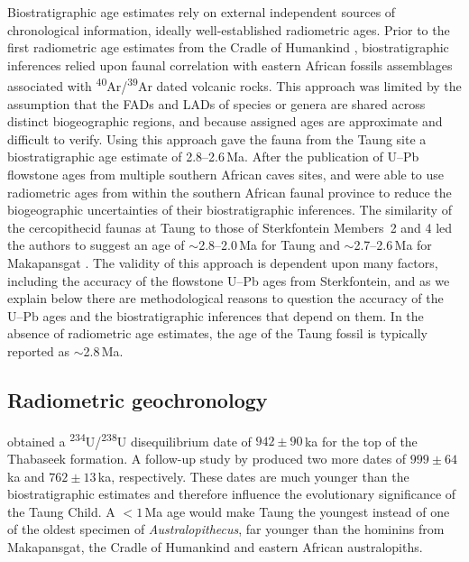 \documentclass[11pt]{article}
\begin{document}
Biostratigraphic age estimates rely on external independent sources of
chronological information, ideally well-established radiometric
ages. Prior to the first radiometric age estimates from the Cradle of
Humankind \citep{partridge2003,walker2006}, biostratigraphic
inferences relied upon faunal correlation with eastern African fossils
assemblages associated with
\textsuperscript{40}Ar/\textsuperscript{39}Ar dated volcanic
rocks. This approach was limited by the assumption that the FADs and
LADs of species or genera are shared across distinct biogeographic
regions, and because assigned ages are approximate and difficult to
verify. Using this approach \citep{mckee1993} gave the fauna from the
Taung site a biostratigraphic age estimate of 2.8--2.6\,Ma. After the
publication of U--Pb flowstone ages from multiple southern African
caves sites, \citet{pickering2019} and \citet{frost2022} were able to
use radiometric ages from within the southern African faunal province
to reduce the biogeographic uncertainties of their biostratigraphic
inferences. The similarity of the cercopithecid faunas at Taung to
those of Sterkfontein Members~2 and 4 led the authors to suggest an
age of $\sim$2.8--2.0\,Ma for Taung and $\sim$2.7--2.6\,Ma for
Makapansgat \citep{frost2022}. The validity of this approach is
dependent upon many factors, including the accuracy of the flowstone
U--Pb ages from Sterkfontein, and as we explain below there are
methodological reasons to question the accuracy of the U--Pb ages and
the biostratigraphic inferences that depend on them. In the absence of
radiometric age estimates, the age of the Taung fossil is typically
reported as $\sim$2.8\,Ma.

\subsection{Radiometric geochronology}
\label{sec:previous_geochron}

\citet{vogel1984} obtained a
\textsuperscript{234}U/\textsuperscript{238}U disequilibrium date of
$942\pm{90}$\,ka for the top of the Thabaseek formation. A follow-up
study by \citet{tobias1993} produced two more dates of
$999\pm{64}$\,ka and $762\pm{13}$\,ka, respectively.  These dates are
much younger than the biostratigraphic estimates and therefore
influence the evolutionary significance of the Taung Child. A $<1\,$Ma
age would make Taung the youngest instead of one of the oldest
specimen of \emph{Australopithecus}, far younger than the hominins
from Makapansgat, the Cradle of Humankind and eastern African
australopiths.
\end{document}
